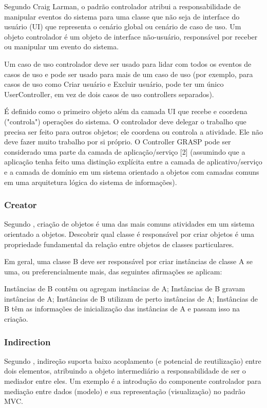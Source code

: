 \documentclass[12pt]{article}
\begin{document}
Segundo \cite{CRAIG_LARMAN} Craig Larman, o padrão controlador atribui a responsabilidade de manipular eventos do sistema para uma classe que não seja de interface do usuário (UI) que representa o cenário global ou cenário de caso de uso. Um objeto controlador é um objeto de interface não-usuário, responsável por receber ou manipular um evento do sistema.

Um caso de uso controlador deve ser usado para lidar com todos os eventos de casos de uso e pode ser usado para mais de um caso de uso (por exemplo, para casos de uso como Criar usuário e Excluir usuário, pode ter um único UserController, em vez de dois casos de uso controllers separados).

É definido como o primeiro objeto além da camada UI que recebe e coordena ("controla") operações do sistema. O controlador deve delegar o trabalho que precisa ser feito para outros objetos; ele coordena ou controla a atividade. Ele não deve fazer muito trabalho por si próprio. O Controller GRASP pode ser considerado uma parte da camada de aplicação/serviço [2] (assumindo que a aplicação tenha feito uma distinção explícita entre a camada de aplicativo/serviço e a camada de domínio em um sistema orientado a objetos com camadas comuns em uma arquitetura lógica do sistema de informações).

\subsubsection{Creator}

Segundo \cite{CRAIG_LARMAN}, criação de objetos é uma das mais comuns atividades em um sistema orientado a objetos. Descobrir qual classe é responsável por criar objetos é uma propriedade fundamental da relação entre objetos de classes particulares.

Em geral, uma classe B deve ser responsável por criar instâncias de classe A se uma, ou preferencialmente mais, das seguintes afirmações se aplicam:

Instâncias de B contêm ou agregam instâncias de A;
Instâncias de B gravam instâncias de A;
Instâncias de B utilizam de perto instâncias de A;
Instâncias de B têm as informações de inicialização das instâncias de A e passam isso na criação.

\subsubsection{Indirection} \label{sec:grasp}

Segundo \cite{CRAIG_LARMAN}, indireção suporta baixo acoplamento (e potencial de reutilização) entre dois elementos, atribuindo a objeto intermediário a responsabilidade de ser o mediador entre eles. Um exemplo é a introdução do componente controlador para mediação entre dados (modelo) e sua representação (visualização) no padrão MVC.
\end{document}
